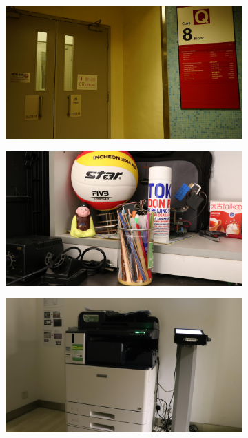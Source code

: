 \begin{figure}
\begin{subfigure}[t]{0.32\textwidth}
    \end{subfigure}
    \hfill
    \begin{subfigure}[t]{0.32\textwidth}
        \centering
        \includegraphics[width=1\textwidth]{images/dataset/Sony_4_200_3200_door_mean.JPG}
    \end{subfigure}
    \hfill
    \begin{subfigure}[t]{0.32\textwidth}
        \centering
        \includegraphics[width=1\textwidth]{images/dataset/Canon80D_8_8_3200_ball_mean.JPG}
    \end{subfigure}
    \hfill
    \begin{subfigure}[t]{0.32\textwidth}
        \centering
        \includegraphics[width=1\textwidth]{images/dataset/Canon80D_8_8_12800_printer_mean.JPG}

\end{subfigure}
\end{figure}
